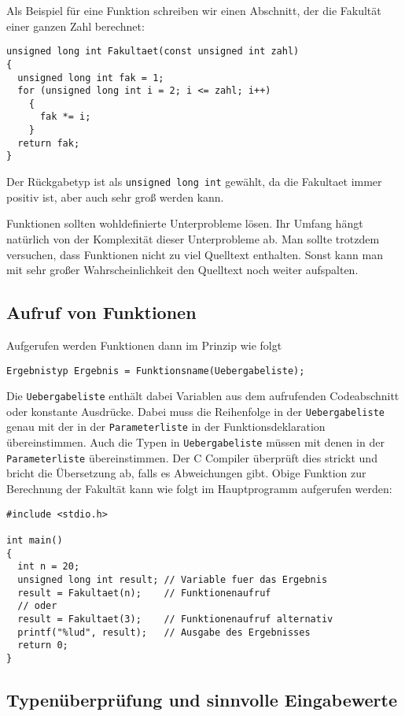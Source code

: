 Als Beispiel für eine Funktion schreiben wir einen Abschnitt, der die Fakultät einer ganzen Zahl berechnet:
\begin{lstlisting}
unsigned long int Fakultaet(const unsigned int zahl)
{
  unsigned long int fak = 1;
  for (unsigned long int i = 2; i <= zahl; i++)
    {
      fak *= i;
    }
  return fak;
}
\end{lstlisting}
Der Rückgabetyp ist als \verb|unsigned long int| gewählt, da die Fakultaet immer positiv ist, aber auch sehr groß werden kann.

Funktionen sollten wohldefinierte Unterprobleme lösen.
Ihr Umfang hängt natürlich von der Komplexität dieser Unterprobleme ab.
Man sollte trotzdem versuchen, dass Funktionen nicht zu viel Quelltext enthalten.
Sonst kann man mit sehr großer Wahrscheinlichkeit den Quelltext noch weiter aufspalten.

\subsection{Aufruf von Funktionen}

Aufgerufen werden Funktionen dann im Prinzip wie folgt
\begin{lstlisting}
Ergebnistyp Ergebnis = Funktionsname(Uebergabeliste);
\end{lstlisting}
Die \verb|Uebergabeliste| enthält dabei Variablen aus dem aufrufenden Codeabschnitt oder konstante Ausdrücke.
Dabei muss die Reihenfolge in der \verb|Uebergabeliste| genau mit der in der \verb|Parameterliste| in der Funktionsdeklaration übereinstimmen.
Auch die Typen in \verb|Uebergabeliste| müssen mit denen in der \verb|Parameterliste| übereinstimmen.
Der C Compiler überprüft dies strickt und bricht die Übersetzung ab, falls es Abweichungen gibt.
Obige Funktion zur Berechnung der Fakultät kann wie folgt im Hauptprogramm aufgerufen werden:
\begin{lstlisting}
#include <stdio.h>

int main()
{
  int n = 20;
  unsigned long int result; // Variable fuer das Ergebnis
  result = Fakultaet(n);    // Funktionenaufruf
  // oder
  result = Fakultaet(3);    // Funktionenaufruf alternativ
  printf("%lud", result);   // Ausgabe des Ergebnisses
  return 0;
}
\end{lstlisting}

\subsection{Typenüberprüfung und sinnvolle Eingabewerte}

